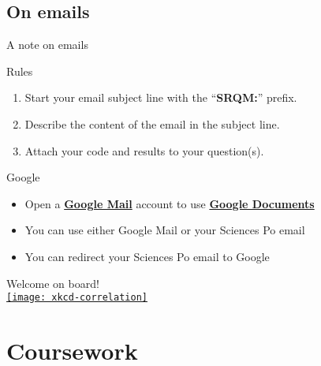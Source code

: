 \documentclass[t]{beamer}
\begin{document}
  \subsection{On emails}
  
  \begin{frame}[t]{A note on emails}

    \begin{alertblock}{Rules}
      \begin{enumerate}
        \item Start your email subject line with the ``\textbf{SRQM:}'' prefix.
        \item Describe the content of the email in the subject line.
        \item Attach your code and results to your question(s).
      \end{enumerate}
    \end{alertblock}
    
    \begin{block}{Google}
			\begin{itemize}
				\item Open a \textbf{\href{http://mail.google.com/}{Google Mail}} %
					account to use \textbf{\href{http://docs.google.com/}{Google Documents}}
				\item You can use either Google Mail or your Sciences Po email
				\item You can redirect your Sciences Po email to Google
			\end{itemize}
    \end{block}

  \end{frame}

  \begin{frame}[t, plain]
    
    \vspace{.1\paperwidth}

    \begin{center}
      {%
      \Large Welcome on board!}\\[.1\paperwidth]
      
      \href{http://xkcd.com/552/}{\texttt{[image: xkcd-correlation]}%
      }
    \end{center}

  \end{frame}

  \section{Coursework}
	
\end{document}
